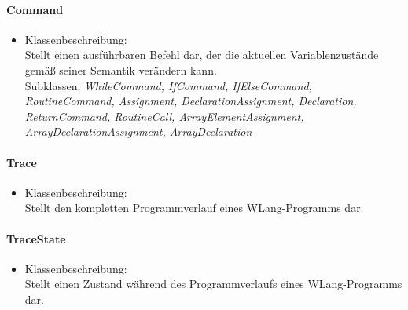 \documentclass[parskip=full]{scrartcl}
\begin{document}
\paragraph{Command}
\begin{itemize}
\item Klassenbeschreibung: \\
Stellt einen ausführbaren Befehl dar, der die aktuellen Variablenzustände gemäß seiner Semantik verändern kann.\\
Subklassen: \textit{WhileCommand, IfCommand, IfElseCommand, RoutineCommand, Assignment, DeclarationAssignment, Declaration, ReturnCommand, RoutineCall, ArrayElementAssignment, ArrayDeclarationAssignment, ArrayDeclaration}
\end{itemize}
\paragraph{Trace}
\begin{itemize}
\item Klassenbeschreibung: \\
Stellt den kompletten Programmverlauf eines WLang-Programms dar.
\end{itemize}
\paragraph{TraceState}
\begin{itemize}
\item Klassenbeschreibung: \\
Stellt einen Zustand während des Programmverlaufs eines WLang-Programms dar.
\end{itemize}
\end{document}

